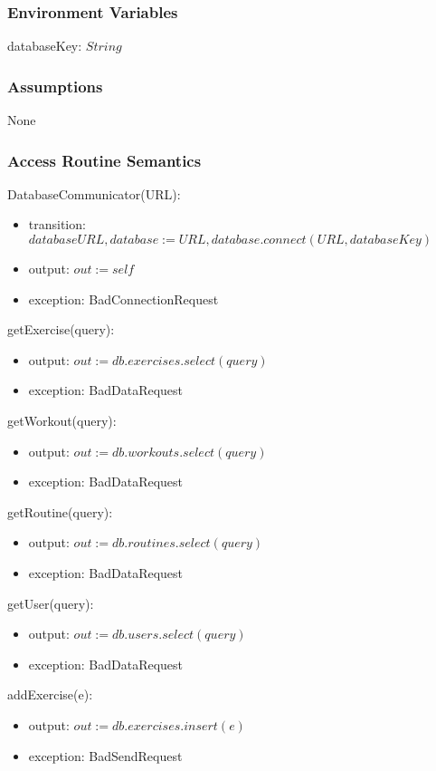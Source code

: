 \documentclass[12pt, titlepage]{article}
\begin{document}
\subsubsection{Environment Variables}
databaseKey: $String$
\subsubsection{Assumptions}
None
\subsubsection{Access Routine Semantics}

DatabaseCommunicator(URL):
\begin{itemize}
	\item transition: $databaseURL, database := URL, database.connect(URL, databaseKey)$
	\item output: $out := self$
	\item exception: BadConnectionRequest
\end{itemize}

getExercise(query):
\begin{itemize}
	\item output: $out := db.exercises.select(query)$
	\item exception: BadDataRequest
\end{itemize}

getWorkout(query):
\begin{itemize}
	\item output: $out := db.workouts.select(query)$
	\item exception: BadDataRequest
\end{itemize}

getRoutine(query):
\begin{itemize}
	\item output: $out := db.routines.select(query)$
	\item exception: BadDataRequest
\end{itemize}

getUser(query):
\begin{itemize}
	\item output: $out := db.users.select(query)$
	\item exception: BadDataRequest
\end{itemize}


addExercise(e):
\begin{itemize}
	\item output: $out := db.exercises.insert(e)$
	\item exception: BadSendRequest
\end{itemize}
\end{document}
